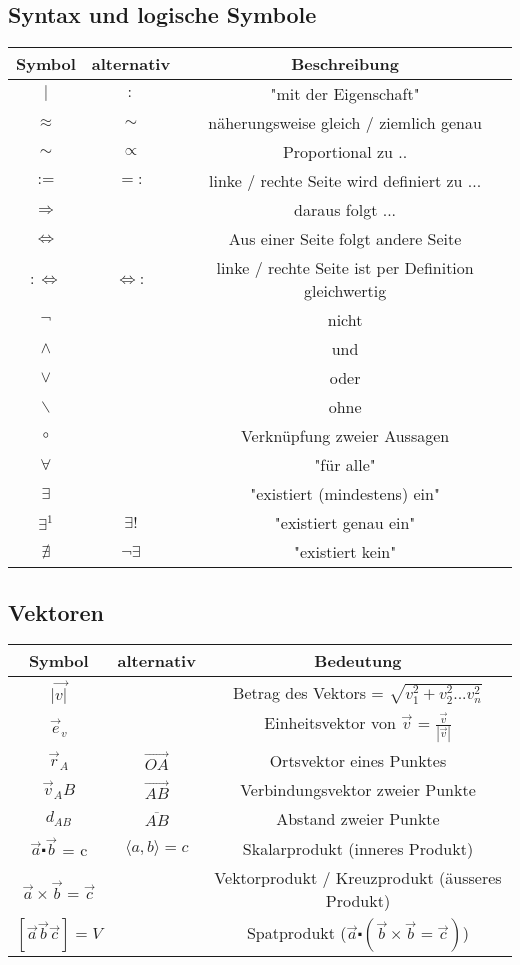\documentclass[11pt,a4paper,onecolumn]{article}
\begin{document}
\begin{flushleft}
\subsection{Syntax und logische Symbole}

\begin{tabular}{|c|c|c|}
\hline
Symbol & alternativ & Beschreibung \\
\hline
$ | $ & $:$ & "mit der Eigenschaft"\\
$\approx $ & $ \sim $ & näherungsweise gleich / ziemlich genau\\
$ \sim $ & $ \propto $ & Proportional zu .. \\
$:= $ & $=:$ & linke / rechte Seite wird definiert zu ...\\
$\Rightarrow$& & daraus folgt ...\\
$\Leftrightarrow$& & Aus einer Seite folgt andere Seite \\
$:\Leftrightarrow$& $\Leftrightarrow:$ & linke / rechte Seite ist per Definition gleichwertig \\
\hline
$ \neg $ & & nicht \\
$ \wedge $ & & und \\
$ \vee $ & & oder \\
$ \backslash $ & & ohne \\
$ \circ $ & & Verknüpfung zweier Aussagen \\
\hline 
$ \forall $ & & "für alle" \\
$ \exists $ & & "existiert (mindestens) ein" \\
$ \exists^{1} $ & $\exists!$ & "existiert genau ein" \\
$ \nexists $ &$\neg\exists$ & "existiert kein" \\
\hline
\end{tabular} 

\subsection{Vektoren}
\begin{tabular}{|c|c|c|}
\hline
Symbol & alternativ & Bedeutung \\
\hline
$|\vec{v|}$ & & Betrag des Vektors = $ \sqrt{v^{2}_{1}+v^{2}_{2} ...v^{2}_{n}}$ \\
$ \vec{e}_{v} $ & & Einheitsvektor von $\vec{v}$ = $ \frac{\vec{v}}{|\vec{v}|}$\\
$\vec{r}_{A}$ & $\vec{OA}$ & Ortsvektor eines Punktes\\
$ \vec{v}_{A}B$ & $\vec{AB}$ & Verbindungsvektor zweier Punkte \\
$ d_{AB} $ & $ \overline{AB} $ & Abstand zweier Punkte \\
\hline
$\vec{a}\centerdot\vec{b} $ = c & $\langle a,b \rangle = c $ & Skalarprodukt (inneres Produkt)\\
$\vec{a}\times\vec{b} = \vec{c}$ & & Vektorprodukt / Kreuzprodukt (äusseres Produkt)\\
$[\vec{a}\vec{b}\vec{c}] = V$ & & Spatprodukt ($\vec{a}\centerdot(\vec{b}\times\vec{b} = \vec{c})$)\\
\hline
\end{tabular}


\end{flushleft}
\end{document}
